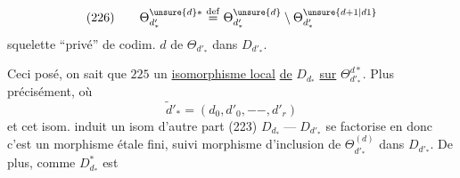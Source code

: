 
\[
(226)\qquad
\Theta_{d'_*}^{\unsure{d}*}\overset{\mathrm{def}}=
\Theta_{d'_*}^{\unsure{d}}\setminus
\Theta_{d'_*}^{\unsure{d+1|d1}}
\]
squelette ``privé'' de codim. $d$ de
$\Theta_{d'_*}$ dans $D_{d'_*}$.

Ceci posé, on sait que $225$ 
un  \uline{isomorphisme local}
\uline{de} $D_{d_*}$ \uline{sur}
$\Theta_{d'_*}^{d*}$. Plus
précisément, 
où 
\[
\widetilde d'_*=(d_0,d'_0,-\!-,d'_r)
\]
et cet isom. induit un isom
d'autre part (223)
$D_{d_*}\mathrel{\text{---}}D_{d'_*}$ se
factorise en
donc c'est un morphisme étale fini,
suivi   morphisme d'inclusion de
$\Theta_{d'_*}^{(d)}$ dans $D_{d'_*}$. De plus, comme $D_{d_*}^{*}$ est
\margin{136}

